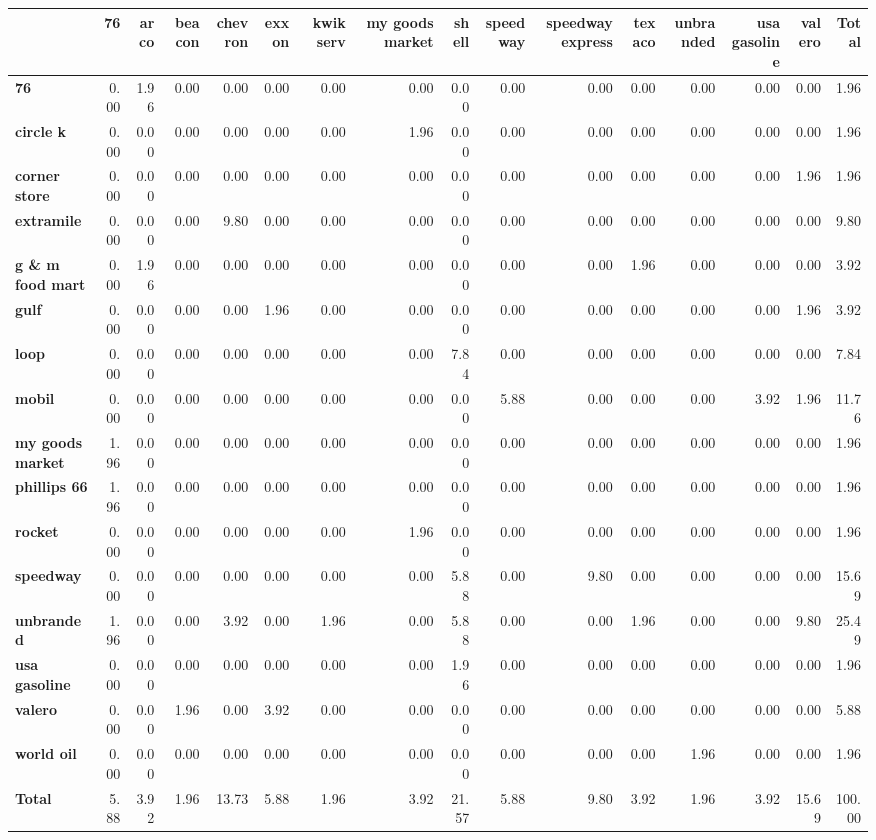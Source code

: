 \begin{tabular}{lrrrrrrrrrrrrrrr}
\toprule
 & \textbf{76} & \textbf{arco} & \textbf{beacon} & \textbf{chevron} & \textbf{exxon} & \textbf{kwik serv} & \textbf{my goods market} & \textbf{shell} & \textbf{speedway} & \textbf{speedway express} & \textbf{texaco} & \textbf{unbranded} & \textbf{usa gasoline} & \textbf{valero} & \textbf{Total} \\
\midrule
\textbf{76} & 0.00 & 1.96 & 0.00 & 0.00 & 0.00 & 0.00 & 0.00 & 0.00 & 0.00 & 0.00 & 0.00 & 0.00 & 0.00 & 0.00 & 1.96 \\
\textbf{circle k} & 0.00 & 0.00 & 0.00 & 0.00 & 0.00 & 0.00 & 1.96 & 0.00 & 0.00 & 0.00 & 0.00 & 0.00 & 0.00 & 0.00 & 1.96 \\
\textbf{corner store} & 0.00 & 0.00 & 0.00 & 0.00 & 0.00 & 0.00 & 0.00 & 0.00 & 0.00 & 0.00 & 0.00 & 0.00 & 0.00 & 1.96 & 1.96 \\
\textbf{extramile} & 0.00 & 0.00 & 0.00 & 9.80 & 0.00 & 0.00 & 0.00 & 0.00 & 0.00 & 0.00 & 0.00 & 0.00 & 0.00 & 0.00 & 9.80 \\
\textbf{g \& m food mart} & 0.00 & 1.96 & 0.00 & 0.00 & 0.00 & 0.00 & 0.00 & 0.00 & 0.00 & 0.00 & 1.96 & 0.00 & 0.00 & 0.00 & 3.92 \\
\textbf{gulf} & 0.00 & 0.00 & 0.00 & 0.00 & 1.96 & 0.00 & 0.00 & 0.00 & 0.00 & 0.00 & 0.00 & 0.00 & 0.00 & 1.96 & 3.92 \\
\textbf{loop} & 0.00 & 0.00 & 0.00 & 0.00 & 0.00 & 0.00 & 0.00 & 7.84 & 0.00 & 0.00 & 0.00 & 0.00 & 0.00 & 0.00 & 7.84 \\
\textbf{mobil} & 0.00 & 0.00 & 0.00 & 0.00 & 0.00 & 0.00 & 0.00 & 0.00 & 5.88 & 0.00 & 0.00 & 0.00 & 3.92 & 1.96 & 11.76 \\
\textbf{my goods market} & 1.96 & 0.00 & 0.00 & 0.00 & 0.00 & 0.00 & 0.00 & 0.00 & 0.00 & 0.00 & 0.00 & 0.00 & 0.00 & 0.00 & 1.96 \\
\textbf{phillips 66} & 1.96 & 0.00 & 0.00 & 0.00 & 0.00 & 0.00 & 0.00 & 0.00 & 0.00 & 0.00 & 0.00 & 0.00 & 0.00 & 0.00 & 1.96 \\
\textbf{rocket} & 0.00 & 0.00 & 0.00 & 0.00 & 0.00 & 0.00 & 1.96 & 0.00 & 0.00 & 0.00 & 0.00 & 0.00 & 0.00 & 0.00 & 1.96 \\
\textbf{speedway} & 0.00 & 0.00 & 0.00 & 0.00 & 0.00 & 0.00 & 0.00 & 5.88 & 0.00 & 9.80 & 0.00 & 0.00 & 0.00 & 0.00 & 15.69 \\
\textbf{unbranded} & 1.96 & 0.00 & 0.00 & 3.92 & 0.00 & 1.96 & 0.00 & 5.88 & 0.00 & 0.00 & 1.96 & 0.00 & 0.00 & 9.80 & 25.49 \\
\textbf{usa gasoline} & 0.00 & 0.00 & 0.00 & 0.00 & 0.00 & 0.00 & 0.00 & 1.96 & 0.00 & 0.00 & 0.00 & 0.00 & 0.00 & 0.00 & 1.96 \\
\textbf{valero} & 0.00 & 0.00 & 1.96 & 0.00 & 3.92 & 0.00 & 0.00 & 0.00 & 0.00 & 0.00 & 0.00 & 0.00 & 0.00 & 0.00 & 5.88 \\
\textbf{world oil} & 0.00 & 0.00 & 0.00 & 0.00 & 0.00 & 0.00 & 0.00 & 0.00 & 0.00 & 0.00 & 0.00 & 1.96 & 0.00 & 0.00 & 1.96 \\
\textbf{Total} & 5.88 & 3.92 & 1.96 & 13.73 & 5.88 & 1.96 & 3.92 & 21.57 & 5.88 & 9.80 & 3.92 & 1.96 & 3.92 & 15.69 & 100.00 \\
\bottomrule
\end{tabular}
